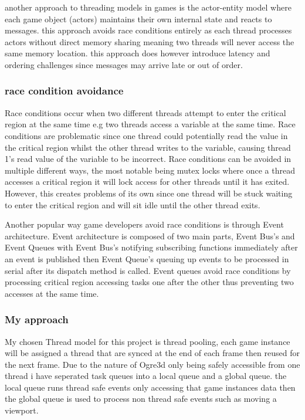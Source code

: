 \documentclass[]{final_report}
\begin{document}
another approach to threading models in games is the actor-entity model where each game object (actors) maintains their own internal state and reacts to messages. this approach avoids race conditions entirely as each thread processes actors without direct memory sharing meaning two threads will never access the same memory location. this approach does however introduce latency and ordering challenges since messages may arrive late or out of order.

\subsubsection{race condition avoidance}
Race conditions occur when two different threads attempt to enter the critical region at the same time e.g two threads access a variable at the same time. Race conditions are problematic since one thread could potentially read the value in the critical region whilst the other thread writes to the variable, causing thread 1’s read value of the variable to be incorrect.
Race conditions can be avoided in multiple different ways, the most notable being mutex locks where once a thread accesses a critical region it will lock access for other threads until it has exited. However, this creates problems of its own since one thread will be stuck waiting to enter the critical region and will sit idle until the other thread exits.

Another popular way game developers avoid race conditions is through Event architecture. Event architecture is composed of two main parts, Event Bus's and Event Queues with Event Bus's notifying subscribing functions immediately after an event is published then Event Queue's queuing up events to be processed in serial after its dispatch method is called. Event queues avoid race conditions by processing critical region accessing tasks one after the other thus preventing two accesses at the same time. 

\subsubsection{My approach}
My chosen Thread model for this project is thread pooling, each game instance will be assigned a thread that are synced at the end of each frame then reused for the next frame. Due to the nature of Ogre3d only being safely accessible from one thread i have seperated task queues into a local queue and a global queue. the local queue runs thread safe events only accessing that game instances data then the global queue is used to process non thread safe events such as moving a viewport.
\end{document}
